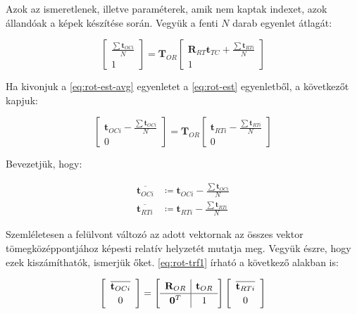 	Azok az ismeretlenek, illetve paraméterek, amik nem kaptak indexet, azok állandóak a képek készítése során. Vegyük a fenti $N$ darab egyenlet átlagát:
	
	\begin{equation}
	\label{eq:rot-est-avg}
	\left[
	\begin{array}{c}
	 	\frac{\sum \mathbf{t}_{OCi}}{N}\\
		1
	\end{array}
	\right]	
	 = \mathbf{T}_{OR} 
	 \left[
	\begin{array}{c}
	\mathbf{R}_{RT}\mathbf{t}_{TC} + \frac{\sum \mathbf{t}_{RTi}}{N} \\ 1
	\end{array}	
	 \right]
	\end{equation}	
	
	Ha kivonjuk a \eqref{eq:rot-est-avg} egyenletet a \eqref{eq:rot-est} egyenletből, a következőt kapjuk:
		
	\begin{equation}
	\label{eq:rot-trf1}
	\left[
	\begin{array}{c}
	 	\mathbf{t}_{OCi} - \frac{\sum \mathbf{t}_{OCi}}{N}\\
		0
	\end{array}
	\right]	
	 = \mathbf{T}_{OR} 
	 \left[
	\begin{array}{c}
	\mathbf{t}_{RTi} - \frac{\sum \mathbf{t}_{RTi}}{N} \\ 0
	\end{array}	
	 \right]
	\end{equation}	
	
	Bevezetjük, hogy:
	
	\begin{equation*}
	\begin{split}
	 	\overline{\mathbf{t}_{OCi}} &\coloneqq \mathbf{t}_{OCi} - \frac{\sum \mathbf{t}_{OCi}}{N} \\
	 	\overline{\mathbf{t}_{RTi}} &\coloneqq \mathbf{t}_{RTi} - \frac{\sum \mathbf{t}_{RTi}}{N} 
	 	\end{split}
	\end{equation*}
	
	Szemléletesen a felülvont változó az adott vektornak az összes vektor tömegközéppontjához képesti relatív helyzetét mutatja meg. Vegyük észre, hogy ezek kiszámíthatók, ismerjük őket. \eqref{eq:rot-trf1} írható a következő alakban is:
	
	\begin{equation}
	\left[
	\begin{array}{c}
	 	\overline{\mathbf{t}_{OCi}}\\
		0
	\end{array}
	\right]	
	 = \left[
	\def\arraystretch{1.2}
	\begin{array}{c|c}
 	\mathbf{R}_{OR} & \mathbf{t}_{OR} \\
 	\hline
	\mathbf{0}^T & 1 
	\end{array}	
	\right]
	 \left[
	\begin{array}{c}
	\overline{\mathbf{t}_{RTi}} \\ 0
	\end{array}	
	 \right]
	\end{equation}
	
